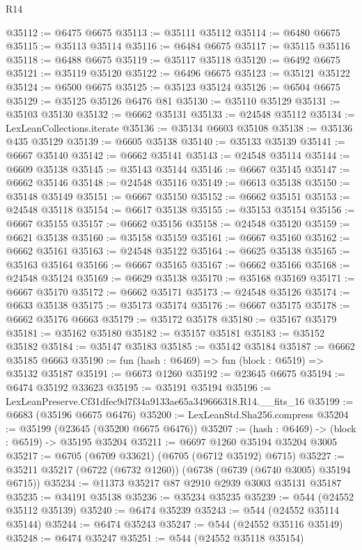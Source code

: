 \begin{lexlean}{R14}
\begin{coremodule}
@35112 := @6475 @6675
@35113 := @35111 @35112
@35114 := @6480 @6675
@35115 := @35113 @35114
@35116 := @6484 @6675
@35117 := @35115 @35116
@35118 := @6488 @6675
@35119 := @35117 @35118
@35120 := @6492 @6675
@35121 := @35119 @35120
@35122 := @6496 @6675
@35123 := @35121 @35122
@35124 := @6500 @6675
@35125 := @35123 @35124
@35126 := @6504 @6675
@35129 := @35125 @35126 @6476 @81
@35130 := @35110 @35129
@35131 := @35103 @35130
@35132 := @6662 @35131
@35133 := @24548 @35112
@35134 := LexLeanCollections.iterate
@35136 := @35134 @6603 @35108
@35138 := @35136 @435 @35129
@35139 := @6605 @35138
@35140 := @35133 @35139
@35141 := @6667 @35140
@35142 := @6662 @35141
@35143 := @24548 @35114
@35144 := @6609 @35138
@35145 := @35143 @35144
@35146 := @6667 @35145
@35147 := @6662 @35146
@35148 := @24548 @35116
@35149 := @6613 @35138
@35150 := @35148 @35149
@35151 := @6667 @35150
@35152 := @6662 @35151
@35153 := @24548 @35118
@35154 := @6617 @35138
@35155 := @35153 @35154
@35156 := @6667 @35155
@35157 := @6662 @35156
@35158 := @24548 @35120
@35159 := @6621 @35138
@35160 := @35158 @35159
@35161 := @6667 @35160
@35162 := @6662 @35161
@35163 := @24548 @35122
@35164 := @6625 @35138
@35165 := @35163 @35164
@35166 := @6667 @35165
@35167 := @6662 @35166
@35168 := @24548 @35124
@35169 := @6629 @35138
@35170 := @35168 @35169
@35171 := @6667 @35170
@35172 := @6662 @35171
@35173 := @24548 @35126
@35174 := @6633 @35138
@35175 := @35173 @35174
@35176 := @6667 @35175
@35178 := @6662 @35176 @6663
@35179 := @35172 @35178
@35180 := @35167 @35179
@35181 := @35162 @35180
@35182 := @35157 @35181
@35183 := @35152 @35182
@35184 := @35147 @35183
@35185 := @35142 @35184
@35187 := @6662 @35185 @6663
@35190 := fun (hash : @6469) => fun (block : @6519) => @35132 @35187
@35191 := @6673 @1260
@35192 := @23645 @6675
@35194 := @6474 @35192 @33623
@35195 := @35191 @35194
@35196 := LexLeanPreserve.Cf31dfec9d7f34a9133ae65a349666318.R14.__fits_16
@35199 := @6683 (@35196 @6675 @6476)
@35200 := LexLeanStd.Sha256.compress
@35204 := @35199 (@23645 (@35200 @6675 @6476))
@35207 := (hash : @6469) -> (block : @6519) -> @35195 @35204
@35211 := @6697 @1260 @35194 @35204 @3005
@35217 := @6705 (@6709 @33621) (@6705 (@6712 @35192) @6715)
@35227 := @35211 @35217 (@6722 (@6732 @1260)) (@6738 (@6739 (@6740 @3005) @35194 @6715))
@35234 := @11373 @35217 @87 @2910 @2939 @3003 @35131 @35187
@35235 := @34191 @35138
@35236 := @35234 @35235
@35239 := @544 (@24552 @35112 @35139)
@35240 := @6474 @35239
@35243 := @544 (@24552 @35114 @35144)
@35244 := @6474 @35243
@35247 := @544 (@24552 @35116 @35149)
@35248 := @6474 @35247
@35251 := @544 (@24552 @35118 @35154)

\end{coremodule}
\end{lexlean}
